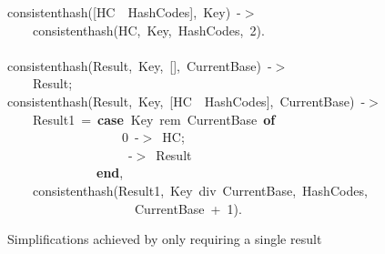 \documentclass[runningheads,a4paper]{llncs}
\newcommand{\hlstd}[1]{\textcolor[rgb]{0,0,0}{#1}}
\newcommand{\hlnum}[1]{\textcolor[rgb]{0.69,0.49,0}{#1}}
\newcommand{\hlopt}[1]{\textcolor[rgb]{0,0,0}{#1}}
\newcommand{\hlkwa}[1]{\textcolor[rgb]{0,0,0}{\bf{#1}}}
\newcommand{\hlkwd}[1]{\textcolor[rgb]{0,0,0.51}{#1}}
\begin{document}
\begin{figure}
\noindent
\ttfamily
\hlkwd{consistent\textunderscore hash}\hlstd{}\hlopt{({[}}\hlstd{HC\ \textbar \ HashCodes}\hlopt{{]},\ }\hlstd{Key}\hlopt{)\ {-}$>$}\hspace*{\fill}\\
\hlstd{}\hlstd{\ \ \ \ }\hlstd{}\hlkwd{consistent\textunderscore hash}\hlstd{}\hlopt{(}\hlstd{HC}\hlopt{,\ }\hlstd{Key}\hlopt{,\ }\hlstd{HashCodes}\hlopt{,\ }\hlstd{}\hlnum{2}\hlstd{}\hlopt{).}\hspace*{\fill}\\
\hlstd{}\hspace*{\fill}\\
\hlkwd{consistent\textunderscore hash}\hlstd{}\hlopt{(}\hlstd{Result}\hlopt{,\ }\hlstd{\textunderscore Key}\hlopt{,\ {[}{]},\ }\hlstd{\textunderscore CurrentBase}\hlopt{)\ {-}$>$}\hspace*{\fill}\\
\hlstd{}\hlstd{\ \ \ \ }\hlstd{Result}\hlopt{;}\hspace*{\fill}\\
\hlstd{}\hlkwd{consistent\textunderscore hash}\hlstd{}\hlopt{(}\hlstd{Result}\hlopt{,\ }\hlstd{Key}\hlopt{,\ {[}}\hlstd{HC\ \textbar \ HashCodes}\hlopt{{]},\ }\hlstd{CurrentBase}\hlopt{)\ {-}$>$}\hspace*{\fill}\\
\hlstd{}\hlstd{\ \ \ \ }\hlstd{Result1\ }\hlopt{=\ }\hlstd{}\hlkwa{case\ }\hlstd{Key\ rem\ CurrentBase\ }\hlkwa{of}\hspace*{\fill}\\
\hlstd{}\hlstd{\ \ \ \ \ \ \ \ \ \ \ \ \ \ \ \ \ \ }\hlstd{}\hlnum{0\ }\hlstd{}\hlopt{{-}$>$\ }\hlstd{HC}\hlopt{;}\hspace*{\fill}\\
\hlstd{}\hlstd{\ \ \ \ \ \ \ \ \ \ \ \ \ \ \ \ \ \ }\hlstd{\textunderscore \ }\hlopt{{-}$>$\ }\hlstd{Result\hspace*{\fill}\\
}\hlstd{\ \ \ \ \ \ \ \ \ \ \ \ \ \ }\hlstd{}\hlkwa{end}\hlstd{}\hlopt{,}\hspace*{\fill}\\
\hlstd{}\hlstd{\ \ \ \ }\hlstd{}\hlkwd{consistent\textunderscore hash}\hlstd{}\hlopt{(}\hlstd{Result1}\hlopt{,\ }\hlstd{Key\ div\ CurrentBase}\hlopt{,\ }\hlstd{HashCodes}\hlopt{,}\hspace*{\fill}\\
\hlstd{}\hlstd{\ \ \ \ \ \ \ \ \ \ \ \ \ \ \ \ \ \ \ \ }\hlstd{CurrentBase\ }\hlopt{+\ }\hlstd{}\hlnum{1}\hlstd{}\hlopt{).}\hspace*{\fill}\\
\mbox{}
\normalfont
\normalsize
\caption{Simplifications achieved by only requiring a single result}
\label{fig:code:new-one-result}
\end{figure}
\end{document}
